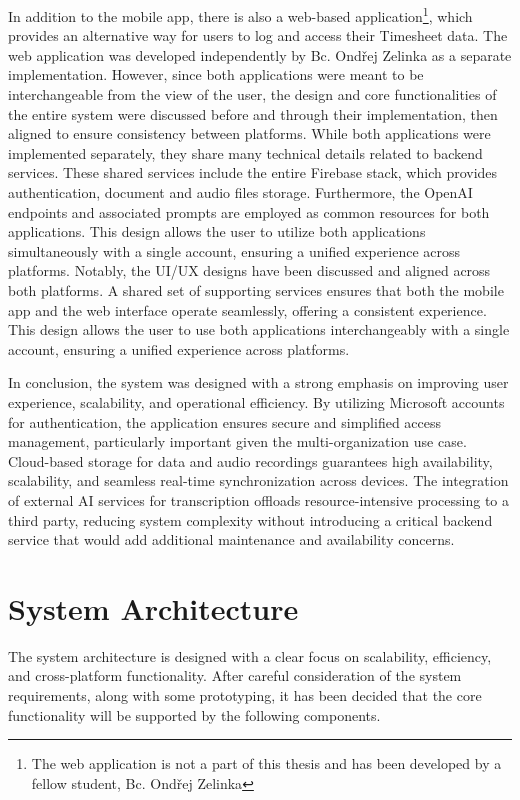 \documentclass[
  digital,     %
  oneside,     %
  nosansbold,  %
  nocolorbold, %
  lof,         %
  lot,         %
]{fithesis4}
\begin{document}
In addition to the mobile app, there is also a web-based application\footnote{The web application is not a part of this thesis and has been developed by a fellow student, Bc. Ondřej Zelinka}, which provides an alternative way for users to log and access their Timesheet data. The web application was developed independently by Bc. Ondřej Zelinka as a separate implementation. However, since both applications were meant to be interchangeable from the view of the user, the design and core functionalities of the entire system were discussed before and through their implementation, then aligned to ensure consistency between platforms. While both applications were implemented separately, they share many technical details related to backend services. These shared services include the entire Firebase stack, which provides authentication, document and audio files storage. Furthermore, the OpenAI endpoints and associated prompts are employed as common resources for both applications. This design allows the user to utilize both applications simultaneously with a single account, ensuring a unified experience across platforms. Notably, the \gls{UI}/\gls{UX} designs have been discussed and aligned across both platforms. A shared set of supporting services ensures that both the mobile app and the web interface operate seamlessly, offering a consistent experience. This design allows the user to use both applications interchangeably with a single account, ensuring a unified experience across platforms.

In conclusion, the system was designed with a strong emphasis on improving user experience, scalability, and operational efficiency. By utilizing Microsoft accounts for authentication, the application ensures secure and simplified access management, particularly important given the multi-organization use case. Cloud-based storage for data and audio recordings guarantees high availability, scalability, and seamless real-time synchronization across devices. The integration of external \gls{AI} services for transcription offloads resource-intensive processing to a third party, reducing system complexity without introducing a critical backend service that would add additional maintenance and availability concerns.

\section{System Architecture}

The system architecture is designed with a clear focus on scalability, efficiency, and cross-platform functionality. After careful consideration of the system requirements, along with some prototyping, it has been decided that the core functionality will be supported by the following components.
\end{document}

